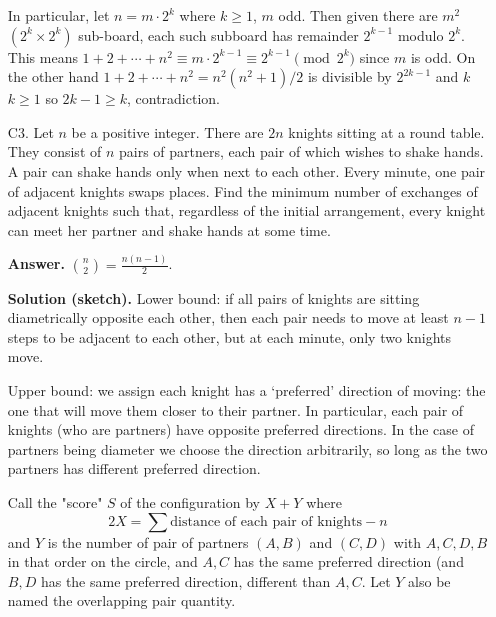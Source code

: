 \documentclass[11pt,a4paper]{article}
\begin{document}
\begin{enumerate}
    	In particular, let $n = m\cdot 2^k$ where $k\ge 1$, $m$ odd. 
    	Then given there are $m^2$ $(2^{k}\times 2^{k})$ sub-board, 
    	each such subboard has remainder $2^{k-1}$ modulo $2^k$. 
    	This means $1+2+\cdots + n^2\equiv m\cdot 2^{k-1}\equiv 2^{k-1}\pmod{2^k}$ since $m$ is odd. 
    	On the other hand $1+2+\cdots + n^2=n^2(n^2+1)/2$ is divisible by $2^{2k-1}$ and $k$ $k\ge 1$ so $2k-1\ge k$, 
    	contradiction. 
    	
    	\item [C3.] 
    	Let $n$ be a positive integer. There are $2n$ knights sitting at a round table. They consist of $n$ pairs of partners, each pair of which wishes to shake hands. A pair can shake hands only when next to each other. Every minute, one pair of adjacent knights swaps places. Find the minimum number of exchanges of adjacent knights such that, regardless of the initial arrangement, every knight can meet her partner and shake hands at some time.
    	
    	\textbf{Answer.} $\binom{n}{2}=\frac{n(n-1)}{2}$. 
    	
    	\textbf{Solution (sketch).} 
    	Lower bound: if all pairs of knights are sitting diametrically opposite each other, then each pair needs to move at least $n - 1$ steps to be adjacent to each other, but at each minute, only two knights move.
    	
    	Upper bound: we assign each knight has a `preferred' direction of moving: 
    	the one that will move them closer to their partner. 
    	In particular, each pair of knights (who are partners) have opposite preferred directions. 
    	In the case of partners being diameter we choose the direction arbitrarily, so long as the two partners has different preferred direction. 
    	
    	Call the "score" $S$ of the configuration by $X+Y$ where 
    	\[2X = \sum \text{distance of each pair of knights} - n\]
    	and $Y$ is the number of pair of partners $(A, B)$ and $(C, D)$ with $A, C, D, B$ in that order on the circle, and $A, C$ has the same preferred direction (and $B, D$ has the same preferred direction, different than $A, C$. Let $Y$ also be named the overlapping pair quantity. 
    	

\end{enumerate}
\end{document}
